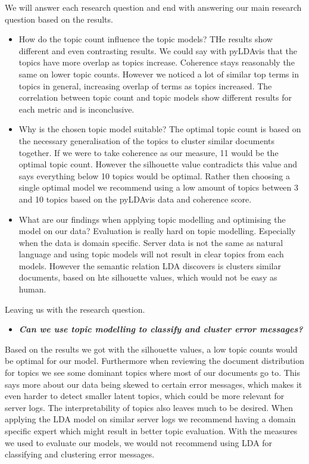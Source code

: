 We will answer each research question and end with answering our main research question based on the results.
\begin{itemize}
    \item How do the topic count influence the topic models?
    THe results show different and even contrasting results. We could say with pyLDAvis that the topics have more overlap as topics increase. Coherence stays reasonably the same on lower topic counts. However we noticed a lot of similar top terms in topics in general, increasing overlap of terms as topics increased. The correlation between topic count and topic models show different results for each metric and is inconclusive.
    \item Why is the chosen topic model suitable?
    The optimal topic count is based on the necessary generalisation of the topics to cluster similar documents together. If we were to take coherence as our measure, 11 would be the optimal topic count. However the silhouette value contradicts this value and says everything below 10 topics would be optimal.
    Rather then choosing a single optimal model we recommend using a low amount of topics between 3 and 10 topics based on the pyLDAvis data and coherence score.
    \item What are our findings when applying topic modelling and optimising the model on our data?
    Evaluation is really hard on topic modelling. Especially when the data is domain specific. Server data is not the same as natural language and using topic models will not result in clear topics from each models. However the semantic relation LDA discovers is clusters similar documents, based on hte silhouette values, which would not be easy as human.
\end{itemize}

Leaving us with the research question.
\begin{itemize}
    \item \textbf{\textit{Can we use topic modelling to classify and cluster error messages?}}
\end{itemize}
Based on the results we got with the silhouette values, a low topic counts would be optimal for our model. Furthermore when reviewing the document distribution for topics we see some dominant topics where most of our documents go to. This says more about our data being skewed to certain error messages, which makes it even harder to detect smaller latent topics, which could be more relevant for server logs. The interpretability of topics also leaves much to be desired. When applying the LDA model on similar server logs we recommend having a domain specific expert which might result in better topic evaluation. With the measures we used to evaluate our models, we would not recommend using LDA for classifying and clustering error messages.

